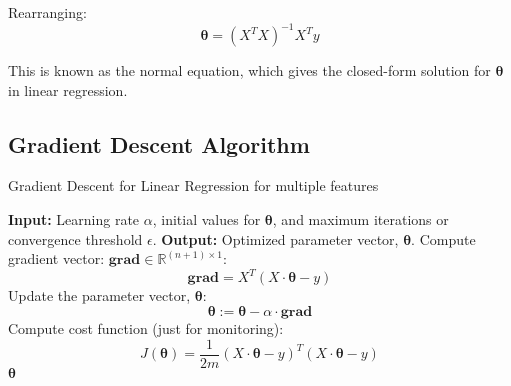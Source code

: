 Rearranging:
\begin{equation}
\boldsymbol{\theta} = (X^T X)^{-1} X^T y
\end{equation}

This is known as the normal equation, which gives the closed-form solution for \(\boldsymbol{\theta}\) in
linear regression.

\subsection{Gradient Descent Algorithm}

\begin{algorithm}[h!]
\caption{Gradient Descent for Linear Regression for multiple features}
\begin{algorithmic}[1]
\STATE \textbf{Input:} Learning rate $\alpha$, initial values for $\boldsymbol{\theta}$, and maximum iterations or
convergence threshold $\epsilon$.
\STATE \textbf{Output:} Optimized parameter vector, $\boldsymbol{\theta}$.
\REPEAT
    \STATE Compute gradient vector: $\textbf{grad} \in \mathbb{R}^{(n+1) \times 1}$:
    \[
        \textbf{grad} = X^T (X \cdot \boldsymbol{\theta} - y)
    \]
    \STATE Update the parameter vector, $\boldsymbol{\theta}$:
    \[
        \boldsymbol{\theta} := \boldsymbol{\theta} - \alpha \cdot \textbf{grad}
    \]
    \STATE Compute cost function (just for monitoring):
    \[
    J(\boldsymbol{\theta}) = \frac{1}{2m} (X \cdot \boldsymbol{\theta} - y)^T (X \cdot \boldsymbol{\theta} - y)
    \]
\RETURN $\boldsymbol{\theta}$
\end{algorithmic}
\end{algorithm}
